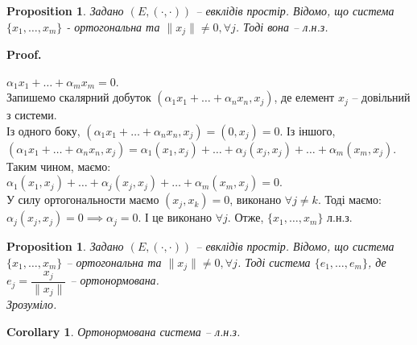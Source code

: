 \documentclass[a4paper, 10pt]{article}
\makeatletter
\theoremstyle{theoremdd}
\newtheorem{proposition}[theorem]{Proposition}
\newtheorem{corollary}[theorem]{Corollary}
\renewenvironment{proof}[1][Proof.\\]{\par
\pushQED{\hfill \qed}%
\normalfont \topsep6\p@\@plus6\p@\relax
\trivlist
\item\relax
{\bfseries
#1\@addpunct{.}}\hspace\labelsep\ignorespaces
}{%
\popQED\endtrivlist\@endpefalse
}
\makeatother
\begin{document}
\begin{proposition}
Задано $(E,(\cdot,\cdot))$ -- евклідів простір. Відомо, що система $\{x_1,\dots,x_m\}$ - ортогональна та $\|x_j\| \neq 0, \forall j$. Тоді вона -- л.н.з.
\end{proposition}

\begin{proof}
$\alpha_1 x_1 + \dots + \alpha_m x_m = 0$.\\
Запишемо скалярний добуток $(\alpha_1 x_1 + \dots + \alpha_n x_n, x_j)$, де елемент $x_j$ -- довільний з системи.\\
Із одного боку, $(\alpha_1 x_1 + \dots + \alpha_n x_n, x_j) = (0,x_j) = 0$. Із іншого,\\
$(\alpha_1 x_1 + \dots + \alpha_n x_n, x_j) = \alpha_1 (x_1,x_j) + \dots + \alpha_j (x_j,x_j) + \dots + \alpha_m (x_m,x_j)$.\\
Таким чином, маємо:\\
$\alpha_1 (x_1,x_j) + \dots + \alpha_j (x_j,x_j) + \dots + \alpha_m (x_m,x_j) = 0$.\\
У силу ортогональности маємо $(x_j,x_k) = 0$, виконано $\forall j \neq k$. Тоді маємо:\\
$\alpha_j (x_j,x_j) = 0 \implies \alpha_j = 0$.
І це виконано $\forall j$. Отже, $\{x_1,\dots,x_m\}$ л.н.з.
\end{proof}

\begin{proposition}
\label{orthogonal_to_orthonormal}
Задано $(E,(\cdot,\cdot))$ -- евклідів простір. Відомо, що система $\{x_1,\dots,x_m\}$ -- ортогональна та $\|x_j\| \neq 0, \forall j$. Тоді система $\{e_1,\dots,e_m\}$, де $e_j = \dfrac{x_j}{\|x_j\|}$ -- ортонормована.\\
\textit{Зрозуміло.}
\end{proposition}

\begin{corollary}
Ортонормована система -- л.н.з.
\end{corollary}
\end{document}
